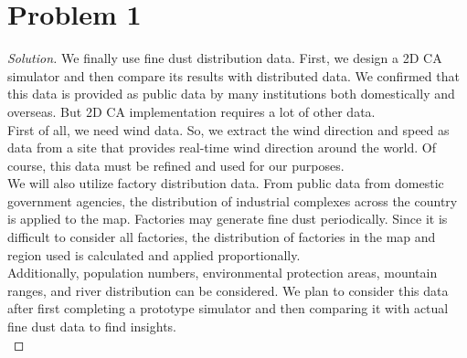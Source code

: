 \section*{Problem 1}
	\begin{proof} [Solution]
		We finally use fine dust distribution data. First, we design a 2D CA simulator and then compare its results with distributed data. We confirmed that this data is provided as public data by many institutions both domestically and overseas. But 2D CA implementation requires a lot of other data.\\
		First of all, we need wind data. So, we extract the wind direction and speed as data from a site that provides real-time wind direction around the world. Of course, this data must be refined and used for our purposes.\\
		We will also utilize factory distribution data. From public data from domestic government agencies, the distribution of industrial complexes across the country is applied to the map. Factories may generate fine dust periodically. Since it is difficult to consider all factories, the distribution of factories in the map and region used is calculated and applied proportionally.\\
		Additionally, population numbers, environmental protection areas, mountain ranges, and river distribution can be considered. We plan to consider this data after first completing a prototype simulator and then comparing it with actual fine dust data to find insights.\\
	\end{proof}